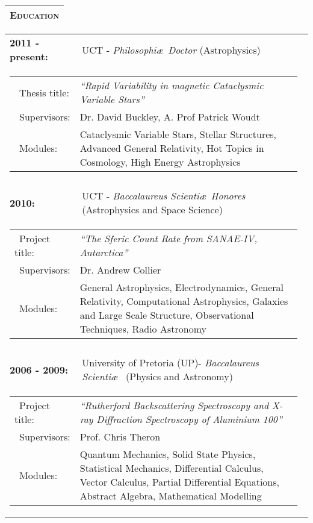 \documentclass{article}
\renewcommand{\section}[1]{
  \vspace{0.4cm}
  \begin{table}[!htp]					%
    \newcolumntype{C}{>{\centering\arraybackslash}X}	%
    \setlength\extrarowheight{3pt} 			%

    \noindent 						%
    \begin{tabularx}{\textwidth}{C}
    \hline \hline 
      \large \textbf{ \textsc{#1} } \\ 
    \hline \hline
    \end{tabularx}
  \end{table}
}
\begin{document}
\section{Education}
\begin{tabular}{lll}
  \textbf{2011 - present:} 	& UCT - \emph{Philosophi\ae\ Doctor} (Astrophysics)\\
    \multicolumn{3}{c}{\parbox{0.95\textwidth}{
	\begin{tabular}{p{0.175\linewidth}p{0.8\linewidth}}
	  \textbullet\ Thesis title: 	& \emph{``Rapid Variability in magnetic Cataclysmic Variable Stars''} \\
	  \textbullet\ Supervisors:	& Dr. David Buckley, A. Prof Patrick Woudt \\
	  \textbullet\ Modules: 	& Cataclysmic Variable Stars, Stellar Structures, Advanced General Relativity, Hot Topics in Cosmology, High Energy Astrophysics \\ 
	\end{tabular} }}
      \\ \\
  
  \textbf{2010:} 		& UCT - \emph{Baccalaureus Scienti\ae\ Honores} (Astrophysics and Space Science) \\
    \multicolumn{3}{c}{\parbox{0.95\textwidth}{
	\begin{tabular}{p{0.175\linewidth}p{0.8\linewidth}}
	  \textbullet\ Project title:	& \emph{``The Sferic Count Rate from SANAE-IV, Antarctica''} \\
	  \textbullet\ Supervisors:	& Dr. Andrew Collier	\\
	  \textbullet\ Modules: 	& General Astrophysics, Electrodynamics, General Relativity, Computational Astrophysics, Galaxies and Large Scale Structure, Observational Techniques, Radio Astronomy \\ 
	\end{tabular} }}
      \\ \\
  
  \textbf{2006 - 2009:} 		& University of Pretoria (UP)-  \emph{Baccalaureus Scienti\ae\ } (Physics and Astronomy) \\ %
    \multicolumn{3}{c}{\parbox{0.95\textwidth}{
	\begin{tabular}{p{0.175\linewidth}p{0.8\linewidth}}
	  \textbullet\ Project title:	& \emph{``Rutherford Backscattering Spectroscopy and X-ray Diffraction Spectroscopy of Aluminium 100''} \\
	  \textbullet\ Supervisors:	& Prof. Chris Theron	\\
	  \textbullet\ Modules: 	& Quantum Mechanics, Solid State Physics, Statistical Mechanics, Differential Calculus, Vector Calculus, Partial Differential Equations, Abstract Algebra, Mathematical Modelling \\ 
	\end{tabular} }}
      \\
      
\end{tabular}
\end{document}
